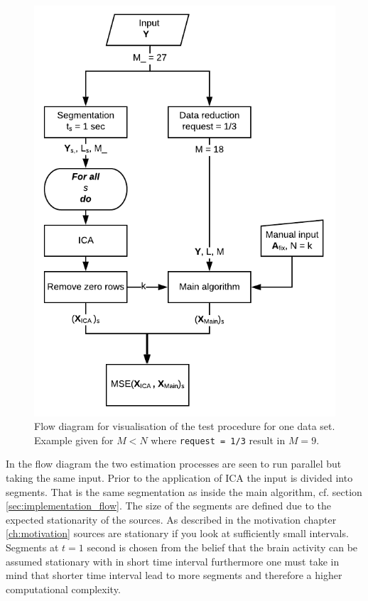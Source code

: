 \begin{figure}[H]
    \centering
	\includegraphics[scale=1]{figures/ch_7/flow2.png}
	\caption{Flow diagram for visualisation of the test procedure for one data set. Example given for $M<N$ where \texttt{request = 1/3} result in $M=9$.}
	\label{fig:flow2}
\end{figure}
In the flow diagram the two estimation processes are seen to run parallel but taking the same input. 
Prior to the application of ICA the input is divided into segments. That is the same segmentation as inside the main algorithm, cf. section \ref{sec:implementation_flow}.
The size of the segments are defined due to the expected stationarity of the sources. As described in the motivation chapter \ref{ch:motivation} sources are stationary if you look at sufficiently small intervals. 
Segments at $t = 1$ second is chosen from the belief that the brain activity can be assumed stationary with in short time interval furthermore one must take in mind that shorter time interval lead to more segments and therefore a higher computational complexity.   
